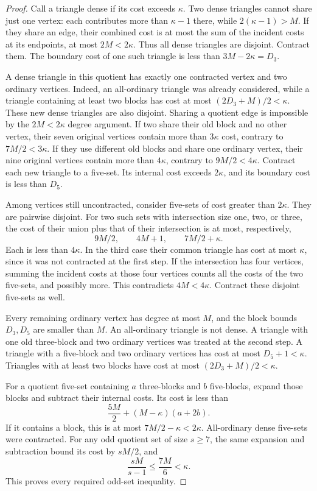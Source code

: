 \documentclass[11pt]{article}
\theoremstyle{definition}\newtheorem{algorithm}{Algorithm}[section]
\numberwithin{equation}{section}
\theoremstyle{remark}\newtheorem*{remark}{Remark}
\begin{document}
\begin{proof}
Call a triangle dense if its cost exceeds $\kappa$.
Two dense triangles cannot share just one vertex: each contributes
more than $\kappa-1$ there, while $2(\kappa-1)>M$.
If they share an edge, their combined cost is at most the sum of
the incident costs at its endpoints, at most $2M<2\kappa$.
Thus all dense triangles are disjoint. Contract them. The boundary
cost of one such triangle is less than $3M-2\kappa=D_3$.

A dense triangle in this quotient has exactly one contracted vertex
and two ordinary vertices. Indeed, an all-ordinary triangle was
already considered, while a triangle containing at least two blocks
has cost at most $(2D_3+M)/2<\kappa$.
These new dense triangles are also disjoint. Sharing a quotient
edge is impossible by the $2M<2\kappa$ degree argument. If two
share their old block and no other vertex, their seven original
vertices contain more than $3\kappa$ cost, contrary to
$7M/2<3\kappa$. If they use different old blocks and share one
ordinary vertex, their nine original vertices contain more than
$4\kappa$, contrary to $9M/2<4\kappa$.
Contract each new triangle to a five-set. Its internal cost exceeds
$2\kappa$, and its boundary cost is less than $D_5$.

Among vertices still uncontracted, consider five-sets of cost greater
than $2\kappa$. They are pairwise disjoint. For two such sets with
intersection size one, two, or three, the cost of their union plus
that of their intersection is at most, respectively,
\[
 9M/2,\qquad 4M+1,\qquad 7M/2+\kappa.
\]
Each is less than $4\kappa$. In the third case their common triangle
has cost at most $\kappa$, since it was not contracted at the first
step. If the intersection has four vertices, summing the incident
costs at those four vertices counts all the costs of the two
five-sets, and possibly more. This contradicts
$4M<4\kappa$. Contract these disjoint five-sets as well.

Every remaining ordinary vertex has degree at most $M$, and the
block bounds $D_3,D_5$ are smaller than $M$.
An all-ordinary triangle is not dense. A triangle with one old
three-block and two ordinary vertices was treated at the second
step. A triangle with a five-block and two ordinary vertices has
cost at most $D_5+1<\kappa$. Triangles with at least two blocks
have cost at most $(2D_3+M)/2<\kappa$.

For a quotient five-set containing $a$ three-blocks and $b$ five-blocks,
expand those blocks and subtract their internal costs. Its cost is
less than
\[
 \frac{5M}{2}+(M-\kappa)(a+2b).
\]
If it contains a block, this is at most $7M/2-\kappa<2\kappa$.
All-ordinary dense five-sets were contracted. For any odd quotient
set of size $s\ge7$, the same expansion and subtraction bound its
cost by $sM/2$, and
\[
 \frac{sM}{s-1}\le\frac{7M}{6}<\kappa.
\]
This proves every required odd-set inequality.
\end{proof}
\end{document}
